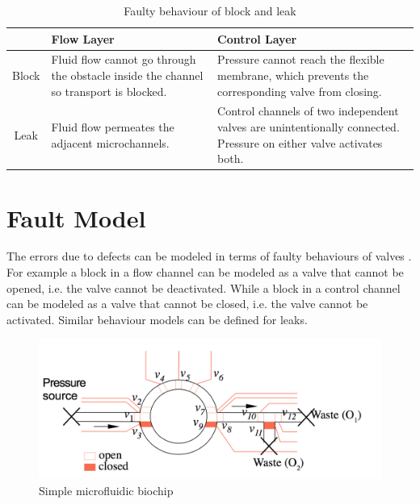 \begin{table}[H]
\centering
\caption{Faulty behaviour of block and leak \cite{fault-modeling}}
\begin{tabular}{| c | >{\centering\arraybackslash} m{4.8cm} | >{\centering\arraybackslash} m{4.8cm} |}
\hline
${}$ & \textbf{Flow Layer} & \textbf{Control Layer}\\ \hline
Block & Fluid flow cannot go through the obstacle inside the channel so transport is blocked. & Pressure cannot reach the flexible membrane, which prevents the corresponding valve from closing. \\ \hline
Leak & Fluid flow permeates the adjacent microchannels. & Control channels of two independent valves are unintentionally connected. Pressure on either valve activates both. \\ \hline
\end{tabular}
\label{tab:faulty-behaviour}
\end{table}

\section{Fault Model}
The errors due to defects can be modeled in terms of faulty behaviours of valves \cite{fault-modeling}. For example a block in a flow channel can be modeled as a valve that cannot be opened, i.e. the valve cannot be deactivated. While a block in a control channel can be modeled as a valve that cannot be closed, i.e. the valve cannot be activated. Similar behaviour models can be defined for leaks.

\begin{figure}[H]
\centering
\includegraphics[scale=0.4]{figures/fault-model-example.png}
\caption[Simple microfluidic biochip]{Simple microfluidic biochip}
\label{fig:fault-model-example}
\end{figure}

